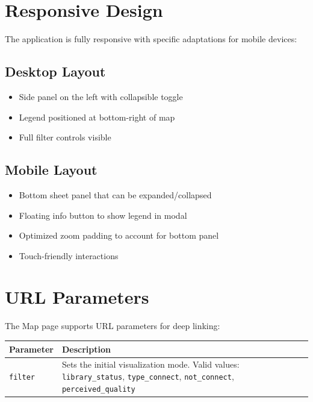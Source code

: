 \documentclass[11pt,a4paper]{article}
\begin{document}
\section{Responsive Design}

The application is fully responsive with specific adaptations for mobile devices:

\subsection{Desktop Layout}
\begin{itemize}
    \item Side panel on the left with collapsible toggle
    \item Legend positioned at bottom-right of map
    \item Full filter controls visible
\end{itemize}

\subsection{Mobile Layout}
\begin{itemize}
    \item Bottom sheet panel that can be expanded/collapsed
    \item Floating info button to show legend in modal
    \item Optimized zoom padding to account for bottom panel
    \item Touch-friendly interactions
\end{itemize}

\section{URL Parameters}

The Map page supports URL parameters for deep linking:

\begin{longtable}{|p{4cm}|p{10cm}|}
\hline
\textbf{Parameter} & \textbf{Description} \\
\hline
\texttt{filter} & Sets the initial visualization mode. Valid values: \texttt{library\_status}, \texttt{type\_connect}, \texttt{not\_connect}, \texttt{perceived\_quality} \\
\hline
\end{longtable}
\end{document}
